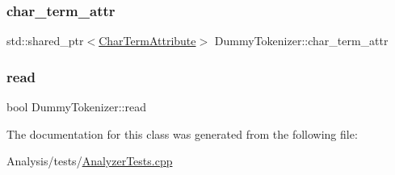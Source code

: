 \subsubsection{\texorpdfstring{char\+\_\+term\+\_\+attr}{char\_term\_attr}}
{\footnotesize\ttfamily std\+::shared\+\_\+ptr$<$\mbox{\hyperlink{classlucene_1_1core_1_1analysis_1_1tokenattributes_1_1CharTermAttribute}{Char\+Term\+Attribute}}$>$ Dummy\+Tokenizer\+::char\+\_\+term\+\_\+attr}

\mbox{\label{classDummyTokenizer_aa9c8e2fcc234b7adcc1d1f1c9dc1716f}} 
\subsubsection{\texorpdfstring{read}{read}}
{\footnotesize\ttfamily bool Dummy\+Tokenizer\+::read}



The documentation for this class was generated from the following file\+:\begin{DoxyCompactItemize}
\item 
Analysis/tests/\mbox{\hyperlink{AnalyzerTests_8cpp}{Analyzer\+Tests.\+cpp}}\end{DoxyCompactItemize}
